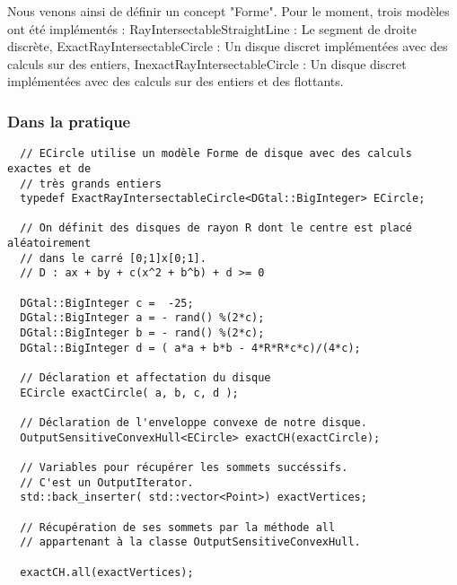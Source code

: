 Nous venons ainsi de définir un concept "Forme". Pour le moment, trois modèles ont été implémentés : RayIntersectableStraightLine : Le segment de droite discrète, ExactRayIntersectableCircle : Un disque discret implémentées avec des calculs sur des entiers, InexactRayIntersectableCircle : Un disque discret implémentées avec des calculs sur des entiers et des flottants.


\subsubsection{Dans la pratique}

\begin{verbatim}
  // ECircle utilise un modèle Forme de disque avec des calculs exactes et de 
  // très grands entiers
  typedef ExactRayIntersectableCircle<DGtal::BigInteger> ECircle;
    
  // On définit des disques de rayon R dont le centre est placé aléatoirement
  // dans le carré [0;1]x[0;1].
  // D : ax + by + c(x^2 + b^b) + d >= 0
    
  DGtal::BigInteger c =  -25;
  DGtal::BigInteger a = - rand() %(2*c);
  DGtal::BigInteger b = - rand() %(2*c);  
  DGtal::BigInteger d = ( a*a + b*b - 4*R*R*c*c)/(4*c);
  
  // Déclaration et affectation du disque
  ECircle exactCircle( a, b, c, d );	 
  
  // Déclaration de l'enveloppe convexe de notre disque.
  OutputSensitiveConvexHull<ECircle> exactCH(exactCircle);
  
  // Variables pour récupérer les sommets succéssifs.
  // C'est un OutputIterator.
  std::back_inserter( std::vector<Point>) exactVertices;
  
  // Récupération de ses sommets par la méthode all 
  // appartenant à la classe OutputSensitiveConvexHull.

  exactCH.all(exactVertices);  
\end{verbatim}

